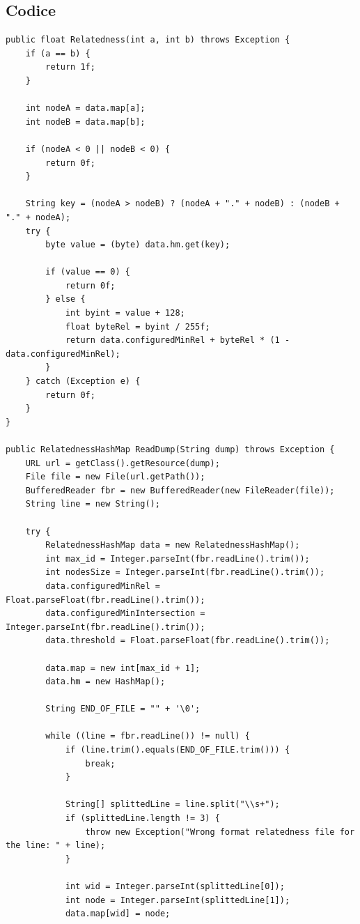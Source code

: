 \subsection{Codice}
\begin{lstlisting}[style=JavaStyle]
public float Relatedness(int a, int b) throws Exception {
    if (a == b) {
        return 1f;
    }

    int nodeA = data.map[a];
    int nodeB = data.map[b];

    if (nodeA < 0 || nodeB < 0) {
        return 0f;
    }

    String key = (nodeA > nodeB) ? (nodeA + "." + nodeB) : (nodeB + "." + nodeA);
    try {
        byte value = (byte) data.hm.get(key);

        if (value == 0) {
            return 0f;
        } else {
            int byint = value + 128;
            float byteRel = byint / 255f;
            return data.configuredMinRel + byteRel * (1 - data.configuredMinRel);
        }
    } catch (Exception e) {
        return 0f;
    }
}

public RelatednessHashMap ReadDump(String dump) throws Exception {
    URL url = getClass().getResource(dump);
    File file = new File(url.getPath());
    BufferedReader fbr = new BufferedReader(new FileReader(file));
    String line = new String();

    try {
        RelatednessHashMap data = new RelatednessHashMap();
        int max_id = Integer.parseInt(fbr.readLine().trim());
        int nodesSize = Integer.parseInt(fbr.readLine().trim());
        data.configuredMinRel = Float.parseFloat(fbr.readLine().trim());
        data.configuredMinIntersection = Integer.parseInt(fbr.readLine().trim());
        data.threshold = Float.parseFloat(fbr.readLine().trim());

        data.map = new int[max_id + 1];
        data.hm = new HashMap();

        String END_OF_FILE = "" + '\0';

        while ((line = fbr.readLine()) != null) {
            if (line.trim().equals(END_OF_FILE.trim())) {
                break;
            }

            String[] splittedLine = line.split("\\s+");
            if (splittedLine.length != 3) {
                throw new Exception("Wrong format relatedness file for the line: " + line);
            }

            int wid = Integer.parseInt(splittedLine[0]);
            int node = Integer.parseInt(splittedLine[1]);
            data.map[wid] = node;


\end{lstlisting}
